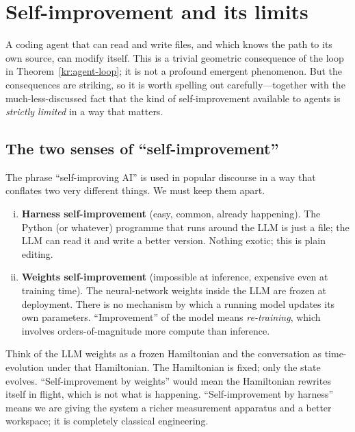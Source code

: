 
\section{Self-improvement and its limits}\label{sec:self-improvement}

A coding agent that can read and write files, and which knows
the path to its own source, can modify itself.  This is a
trivial geometric consequence of the loop in
Theorem~\ref{kr:agent-loop}; it is not a profound emergent
phenomenon.  But the consequences are striking, so it is worth
spelling out carefully---together with the much-less-discussed
fact that the kind of self-improvement available to agents is
\emph{strictly limited} in a way that matters.

\subsection{The two senses of ``self-improvement''}

The phrase ``self-improving AI'' is used in popular discourse
in a way that conflates two very different things.  We must
keep them apart.

\begin{keyresult}
  \begin{enumerate}[(i)]
    \item \textbf{Harness self-improvement} (easy, common,
      already happening).  The Python (or whatever) programme
      that runs around the LLM is just a file; the LLM can
      read it and write a better version.  Nothing exotic;
      this is plain editing.
    \item \textbf{Weights self-improvement} (impossible at
      inference, expensive even at training time).  The
      neural-network weights inside the LLM are frozen at
      deployment.  There is no mechanism by which a running
      model updates its own parameters.  ``Improvement'' of
      the model means \emph{re-training}, which involves
      orders-of-magnitude more compute than inference.
  \end{enumerate}
\end{keyresult}

\begin{intuition}
  Think of the LLM weights as a frozen Hamiltonian and the
  conversation as time-evolution under that Hamiltonian.  The
  Hamiltonian is fixed; only the state evolves.  ``Self-improvement
  by weights'' would mean the Hamiltonian rewrites itself in
  flight, which is not what is happening.  ``Self-improvement
  by harness'' means we are giving the system a richer
  measurement apparatus and a better workspace; it is
  completely classical engineering.
\end{intuition}

